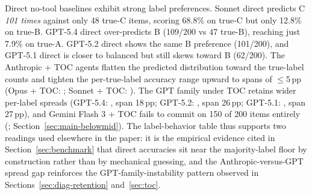\documentclass{article}
\begin{document}
Direct no-tool baselines exhibit strong label preferences. Sonnet direct predicts C \emph{101 times} against only 48 true-C items, scoring 68.8\% on true-C but only 12.8\% on true-B. GPT-5.4 direct over-predicts B (109/200 vs 47 true-B), reaching just 7.9\% on true-A. GPT-5.2 direct shows the same B preference (101/200), and GPT-5.1 direct is closer to balanced but still skews toward B (62/200). The Anthropic + TOC agents flatten the predicted distribution toward the true-label counts and tighten the per-true-label accuracy range upward to spans of $\le$5\,pp (Opus + TOC: \OpusTOCLabelRange; Sonnet + TOC: \SonnetTOCLabelRange). The GPT family under TOC retains wider per-label spreads (GPT-5.4: \GPTFiveFourTOCLabelRange{}, span 18\,pp; GPT-5.2: \GPTFiveTwoTOCLabelRange{}, span 26\,pp; GPT-5.1: \GPTFiveOneTOCLabelRange{}, span 27\,pp), and Gemini Flash 3 + TOC fails to commit on 150 of 200 items entirely (\GeminiThreeFlashTOCPredDist; Section~\ref{sec:main-belowmid}). The label-behavior table thus supports two readings used elsewhere in the paper: it is the empirical evidence cited in Section~\ref{sec:benchmark} that direct accuracies sit near the majority-label floor by construction rather than by mechanical guessing, and the Anthropic-versus-GPT spread gap reinforces the GPT-family-instability pattern observed in Sections~\ref{sec:diag-retention} and~\ref{sec:toc}.
\end{document}
